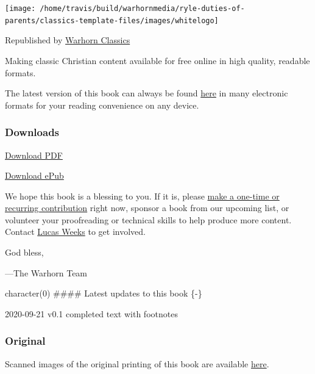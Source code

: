 \documentclass[
]{book}
\begin{document}
\begin{center}\texttt{[image: /home/travis/build/warhornmedia/ryle-duties-of-parents/classics-template-files/images/whitelogo]} \end{center}

Republished by \href{https://classics.warhornmedia.com/}{Warhorn Classics}

Making classic Christian content available for free online in high quality, readable formats.

The latest version of this book can always be found \href{https://warhornmedia.github.io/ryle-duties-of-parents}{here} in many electronic formats for your reading convenience on any device.

\hypertarget{downloads}{%
\subsubsection*{Downloads}\label{downloads}}

\href{https://warhornmedia.github.io/ryle-duties-of-parents/Ryle-Duties_of_Parents.pdf}{Download PDF}

\href{https://warhornmedia.github.io/ryle-duties-of-parents/Ryle-Duties_of_Parents.epub}{Download ePub}

We hope this book is a blessing to you. If it is, please \href{https://warhornmedia.com/give}{make a one-time or recurring contribution} right now, sponsor a book from our upcoming list, or volunteer your proofreading or technical skills to help produce more content. Contact \href{mailto:lucas@beggarsborn.com}{Lucas Weeks} to get involved.

God bless,

---The Warhorn Team

character(0)
\#\#\#\# Latest updates to this book \{-\}

2020-09-21 \textbar{} v0.1 \textbar{} completed text with footnotes

\hypertarget{original}{%
\subsubsection*{Original}\label{original}}

Scanned images of the original printing of this book are available \href{https://www.google.com/books/edition/Wheat_Or_Chaff/il5QAQAAMAAJ?hl=en\&gbpv=1\&pg=PA219\&printsec=frontcover}{here}.
\end{document}
